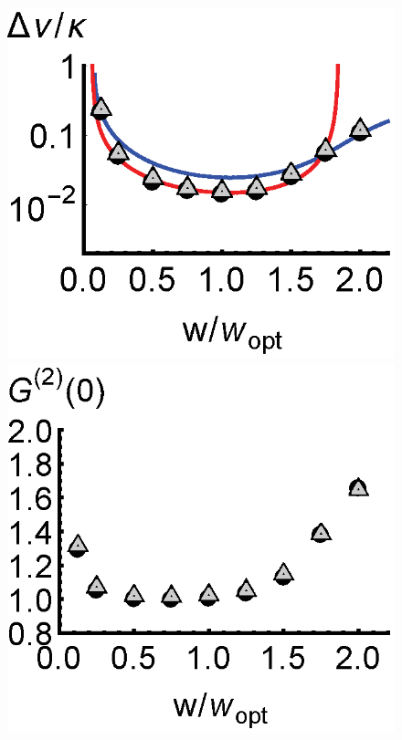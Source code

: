 \documentclass[aps,
twocolumn,
superscriptaddress,groupedaddress]{revtex4}
\begin{document}
\begin{figure}
\begin{center}
	\hspace{-5.0mm} \includegraphics[scale =0.38] {N40CrossoverLW.eps}
	\hspace{-5.0mm} \includegraphics[scale =0.38] {N40CrossoverG2.eps}\\ \vspace{0mm}

\end{center}
\end{figure}
\end{document}
